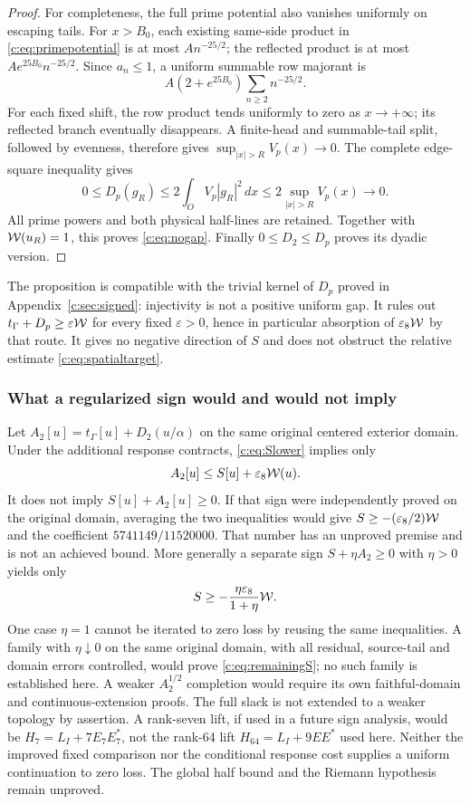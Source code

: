 \documentclass[11pt,a4paper]{article}
\numberwithin{equation}{section}
\theoremstyle{definition}\newtheorem{definition}[theorem]{Definition}
\theoremstyle{remark}\newtheorem{remark}[theorem]{Remark}
\newcommand{\tg}{t_\Gamma}\newcommand{\cg}{c_\Gamma}
\begin{document}
\begin{proof}
For completeness, the full prime potential also vanishes uniformly on escaping tails.
For $x>{B_0}$, each existing same-side product in \eqref{c:eq:primepotential} is at most $An^{-25/2}$; the reflected product is at most $Ae^{25{B_0}}n^{-25/2}$.
Since $a_n\le1$, a uniform summable row majorant is
\[
 A(2+e^{25{B_0}})\sum_{n\ge2}n^{-25/2}.
\]
For each fixed shift, the row product tends uniformly to zero as $x\to+\infty$; its reflected branch eventually disappears.
A finite-head and summable-tail split, followed by evenness, therefore gives
$\sup_{|x|>R}V_p(x)\to0$.
The complete edge-square inequality gives
\[
 0\le D_p(g_R)\le2\int_OV_p|g_R|^2\,dx
 \le2\sup_{|x|>R}V_p(x)\longrightarrow0.
\]
All prime powers and both physical half-lines are retained.
Together with $\mathcal W(u_R)=1$, this proves \eqref{c:eq:nogap}.
Finally $0\le D_2\le D_p$ proves its dyadic version.
\end{proof}
The proposition is compatible with the trivial kernel of $D_p$ proved in Appendix~\ref{c:sec:signed}: injectivity is not a positive uniform gap.
It rules out $\tg+D_p\ge\varepsilon\wo$ for every fixed $\varepsilon>0$, hence in particular absorption of $\varepsilon_8\mathcal W$ by that route.
It gives no negative direction of $S$ and does not obstruct the relative estimate \eqref{c:eq:spatialtarget}.

\subsubsection{What a regularized sign would and would not imply}
Let $A_2[u]=\tg[u]+D_2(u/\alpha)$ on the same original centered exterior domain.
Under the additional response contracts, \eqref{c:eq:Slower} implies only
\[
 A_2[u]\le S[u]+\varepsilon_8\mathcal W(u).
\]
It does not imply $S[u]+A_2[u]\ge0$.
If that sign were independently proved on the original domain, averaging the two inequalities would give
$S\ge-(\varepsilon_8/2)\mathcal W$ and the coefficient $5741149/11520000$.
That number has an unproved premise and is not an achieved bound.
More generally a separate sign $S+\eta A_2\ge0$ with $\eta>0$ yields only
\[
 S\ge-\frac{\eta\varepsilon_8}{1+\eta}\mathcal W.
\]
One case $\eta=1$ cannot be iterated to zero loss by reusing the same inequalities.
A family with $\eta\downarrow0$ on the same original domain, with all residual, source-tail and domain errors controlled, would prove \eqref{c:eq:remainingS}; no such family is established here.
A weaker $A_2^{1/2}$ completion would require its own faithful-domain and continuous-extension proofs. The full slack is not extended to a weaker topology by assertion.
A rank-seven lift, if used in a future sign analysis, would be $H_7=L_I+7E_7E_7^*$, not the rank-64 lift $H_{64}=L_I+9EE^*$ used here.
Neither the improved fixed comparison nor the conditional response cost supplies a uniform continuation to zero loss.
The global half bound and the Riemann hypothesis remain unproved.
\end{document}
